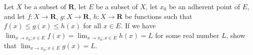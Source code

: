 \begin{exercise}\label{ex 9.3.5}
     Let \(X\) be a subset of \(\mathbf{R}\), let \(E\) be a subset of \(X\), let \(x_0\) be an adherent point of \(E\), and let \(f : X \to \mathbf{R}\), \(g : X \to \mathbf{R}\), \(h : X \to \mathbf{R}\) be functions such that \(f(x) \leq g(x) \leq h(x)\) for all \(x \in E\).
     If we have \(\lim_{x \to x_0 ; x \in E} f(x) = \lim_{x \to x_0 ; x \in E} h(x) = L\) for some real number \(L\), show that \(\lim_{x \to x_0 ; x \in E} g(x) = L\).
\end{exercise}